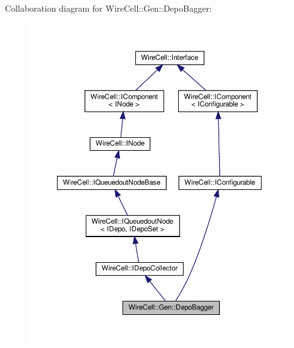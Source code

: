 Collaboration diagram for Wire\+Cell\+:\+:Gen\+:\+:Depo\+Bagger\+:
\nopagebreak
\begin{figure}[H]
\begin{center}
\leavevmode
\includegraphics[width=350pt]{class_wire_cell_1_1_gen_1_1_depo_bagger__coll__graph}
\end{center}
\end{figure}

